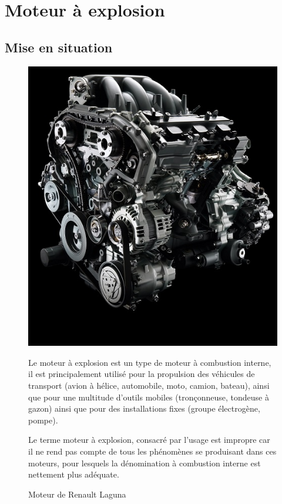 

\newpage

\section{Moteur à explosion}

\subsection{Mise en situation}

\begin{figure}[htbp]
\begin{minipage}[c]{.4\linewidth}
\begin{center}
\includegraphics[width=\linewidth]{img/moteur_laguna.jpg}
\caption{Moteur de Renault Laguna}
\label{fig:image8}
\end{center}
\end{minipage}
\hfill
\begin{minipage}[c]{.55\linewidth}
Le moteur à explosion est un type de moteur à combustion interne, il est principalement utilisé pour la propulsion des véhicules de transport (avion à hélice, automobile, moto, camion, bateau), ainsi que pour une multitude d'outils mobiles (tronçonneuse, tondeuse à gazon) ainsi que pour des installations fixes (groupe électrogène, pompe).

Le terme moteur à explosion, consacré par l'usage est impropre car il ne rend pas compte de tous les phénomènes se produisant dans ces moteurs, pour lesquels la dénomination à combustion interne est nettement plus adéquate.
\end{minipage}
\end{figure}

